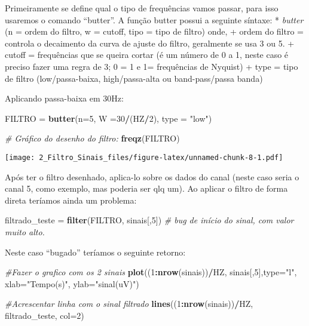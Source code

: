 \documentclass[]{article}
\newenvironment{Shaded}{\begin{snugshade}}{\end{snugshade}}
\newcommand{\KeywordTok}[1]{\textcolor[rgb]{0.13,0.29,0.53}{\textbf{#1}}}
\newcommand{\DataTypeTok}[1]{\textcolor[rgb]{0.13,0.29,0.53}{#1}}
\newcommand{\DecValTok}[1]{\textcolor[rgb]{0.00,0.00,0.81}{#1}}
\newcommand{\StringTok}[1]{\textcolor[rgb]{0.31,0.60,0.02}{#1}}
\newcommand{\CommentTok}[1]{\textcolor[rgb]{0.56,0.35,0.01}{\textit{#1}}}
\newcommand{\OperatorTok}[1]{\textcolor[rgb]{0.81,0.36,0.00}{\textbf{#1}}}
\newcommand{\NormalTok}[1]{#1}
\begin{document}
Primeiramente se define qual o tipo de frequências vamos passar, para
isso usaremos o comando ``butter''. A função butter possui a seguinte
síntaxe: * \emph{butter} (n = ordem do filtro, w = cutoff, tipo = tipo
de filtro) onde, + ordem do filtro = controla o decaimento da curva de
ajuste do filtro, geralmente se usa 3 ou 5. + cutoff = frequências que
se queira cortar (é um número de 0 a 1, neste caso é preciso fazer uma
regra de 3; 0 = 1 e 1= frequências de Nyquist) + type = tipo de filtro
(low/passa-baixa, high/passa-alta ou band-pass/passa banda)

Aplicando passa-baixa em 30Hz:

\begin{Shaded}
\begin{Highlighting}[]
\NormalTok{FILTRO =}\StringTok{ }\KeywordTok{butter}\NormalTok{(}\DataTypeTok{n=}\DecValTok{5}\NormalTok{, }\DataTypeTok{W =}\DecValTok{30}\OperatorTok{/}\NormalTok{(HZ}\OperatorTok{/}\DecValTok{2}\NormalTok{), }\DataTypeTok{type =} \StringTok{"low"}\NormalTok{)}

\CommentTok{# Gráfico do desenho do filtro:}
\KeywordTok{freqz}\NormalTok{(FILTRO)}
\end{Highlighting}
\end{Shaded}

\texttt{[image: 2\_Filtro\_Sinais\_files/figure-latex/unnamed-chunk-8-1.pdf]}

Após ter o filtro desenhado, aplica-lo sobre os dados do canal (neste
caso seria o canal 5, como exemplo, mas poderia ser qlq um). Ao aplicar
o filtro de forma direta teríamos ainda um problema:

\begin{Shaded}
\begin{Highlighting}[]
\NormalTok{filtrado_teste =}\StringTok{ }\KeywordTok{filter}\NormalTok{(FILTRO, sinais[,}\DecValTok{5}\NormalTok{]) }
\CommentTok{# bug de início do sinal, com valor muito alto.}
\end{Highlighting}
\end{Shaded}

Neste caso ``bugado'' teríamos o seguinte retorno:

\begin{Shaded}
\begin{Highlighting}[]
\CommentTok{#Fazer o grafico com os 2 sinais}
\KeywordTok{plot}\NormalTok{((}\DecValTok{1}\OperatorTok{:}\KeywordTok{nrow}\NormalTok{(sinais))}\OperatorTok{/}\NormalTok{HZ, sinais[,}\DecValTok{5}\NormalTok{],}\DataTypeTok{type=}\StringTok{"l"}\NormalTok{,}
     \DataTypeTok{xlab=}\StringTok{"Tempo(s)"}\NormalTok{, }\DataTypeTok{ylab=}\StringTok{"sinal(uV)"}\NormalTok{)}

\CommentTok{#Acrescentar linha com o sinal filtrado}
\KeywordTok{lines}\NormalTok{((}\DecValTok{1}\OperatorTok{:}\KeywordTok{nrow}\NormalTok{(sinais))}\OperatorTok{/}\NormalTok{HZ, filtrado_teste, }\DataTypeTok{col=}\DecValTok{2}\NormalTok{)}
\end{Highlighting}
\end{Shaded}
\end{document}
